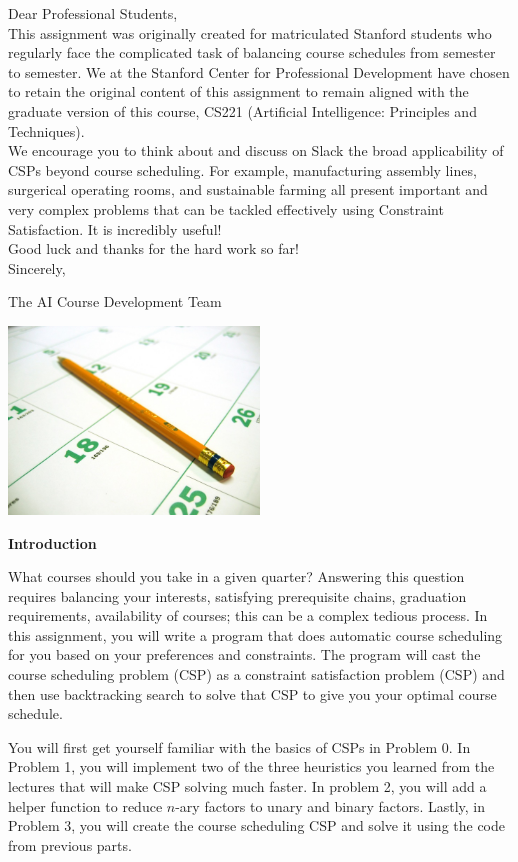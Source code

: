 \Large

Dear Professional Students,\\

This assignment was originally created for matriculated Stanford students who
regularly face the complicated task of balancing course schedules from semester
to semester. We at the Stanford Center for Professional Development have
chosen to retain the original content of this assignment to remain aligned with
the graduate version of this course, CS221 (Artificial Intelligence: Principles
and Techniques).\\

We encourage you to think about and discuss on Slack the broad
applicability of CSPs beyond course scheduling.  For example, manufacturing
assembly lines, surgerical operating rooms, and sustainable farming all
present important and very complex problems that can be tackled effectively
using Constraint Satisfaction.  It is incredibly useful!\\

Good luck and thanks for the hard work so far!\\

Sincerely,

The AI Course Development Team

\normalsize
\clearpage

\begin{center}
\includegraphics[width=0.5\textwidth]{media/calendar.jpg}
\end{center}

{\bf Introduction}

What courses should you take in a given quarter?  Answering this question
requires balancing your interests, satisfying prerequisite chains, graduation
requirements, availability of courses; this can be a complex tedious process.
In this assignment, you will write a program that does automatic course
scheduling for you based on your preferences and constraints. The program will
cast the course scheduling problem (CSP) as a constraint satisfaction problem
(CSP) and then use backtracking search to solve that CSP to give you your
optimal course schedule.

You will first get yourself familiar with the basics of CSPs in Problem 0. In
Problem 1, you will implement two of the three heuristics you learned from the
lectures that will make CSP solving much faster. In problem 2, you will add a
helper function to reduce $n$-ary factors to unary and binary factors. Lastly,
in Problem 3, you will create the course scheduling CSP and solve it using the
code from previous parts.
